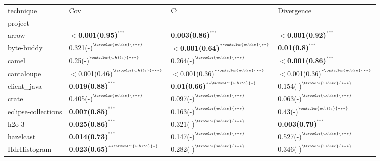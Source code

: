 \begin{tabular}{llll}
\toprule
technique &                                                          Cov &                                                            Ci &                                                    Divergence \\
project             &                                                              &                                                               &                                                               \\
\midrule
arrow               &  \textbf{$<$0.001(0.95)}\tiny{$^{^{***}}$} &  \textbf{0.003(0.86)}\tiny{$^{^{***}}$} &  \textbf{$<$0.001(0.92)}\tiny{$^{^{***}}$} \\
byte-buddy          &  0.321(-)\tiny{$^{^{\textcolor{white}{***}}}$} &  \textbf{$<$0.001(0.64)}\tiny{$^{^{*\textcolor{white}{**}}}$} &  \textbf{0.01(0.8)}\tiny{$^{^{***}}$} \\
camel               &  0.25(-)\tiny{$^{^{\textcolor{white}{***}}}$} &  0.264(-)\tiny{$^{^{\textcolor{white}{***}}}$} &  \textbf{$<$0.001(0.86)}\tiny{$^{^{***}}$} \\
cantaloupe          &  $<$0.001(0.46)\tiny{$^{^{\textcolor{white}{***}}}$} &  $<$0.001(0.36)\tiny{$^{^{*\textcolor{white}{**}}}$} &  $<$0.001(0.36)\tiny{$^{^{*\textcolor{white}{**}}}$} \\
client_java         &  \textbf{0.019(0.88)}\tiny{$^{^{***}}$} &  \textbf{0.01(0.66)}\tiny{$^{^{**\textcolor{white}{*}}}$} &  0.154(-)\tiny{$^{^{\textcolor{white}{***}}}$} \\
crate               &  0.405(-)\tiny{$^{^{\textcolor{white}{***}}}$} &  0.097(-)\tiny{$^{^{\textcolor{white}{***}}}$} &  0.063(-)\tiny{$^{^{\textcolor{white}{***}}}$} \\
eclipse-collections &  \textbf{0.007(0.85)}\tiny{$^{^{***}}$} &  0.163(-)\tiny{$^{^{\textcolor{white}{***}}}$} &  0.43(-)\tiny{$^{^{\textcolor{white}{***}}}$} \\
h2o-3               &  \textbf{0.025(0.86)}\tiny{$^{^{***}}$} &  0.321(-)\tiny{$^{^{\textcolor{white}{***}}}$} &  \textbf{0.003(0.79)}\tiny{$^{^{***}}$} \\
hazelcast           &  \textbf{0.014(0.73)}\tiny{$^{^{***}}$} &  0.147(-)\tiny{$^{^{\textcolor{white}{***}}}$} &  0.527(-)\tiny{$^{^{\textcolor{white}{***}}}$} \\
HdrHistogram        &  \textbf{0.023(0.65)}\tiny{$^{^{**\textcolor{white}{*}}}$} &  0.282(-)\tiny{$^{^{\textcolor{white}{***}}}$} &  0.346(-)\tiny{$^{^{\textcolor{white}{***}}}$} \\

\end{tabular}
